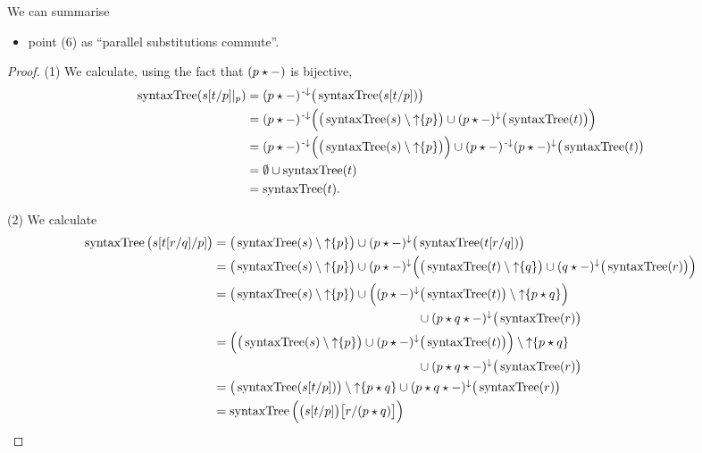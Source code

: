 We can summarise
\begin{itemize}
\item point (6) as ``parallel substitutions commute''.
\end{itemize}
\begin{proof}
(1) We calculate, using the fact that $(p\star -)$ is bijective,
\begin{align*}
\operatorname{syntaxTree}(s[t/p]|_p) &= (p\star -)^{\text{\hspace{0.15em}-}\downarrow}\big(\operatorname{syntaxTree}(s[t/p])\big) \\
&= (p\star -)^{\text{\hspace{0.15em}-}\downarrow}\Big(\big(\operatorname{syntaxTree}(s) \setminus \operatorname{\uparrow}\{p\}\big) \cup (p\star -)^{\downarrow}\big(\operatorname{syntaxTree}(t)\big)\Big) \\
&= (p\star -)^{\text{\hspace{0.15em}-}\downarrow}\Big(\big(\operatorname{syntaxTree}(s) \setminus \operatorname{\uparrow}\{p\}\big)\Big) \cup (p\star -)^{\text{\hspace{0.15em}-}\downarrow}(p\star -)^{\downarrow}\big(\operatorname{syntaxTree}(t)\big) \\
&= \emptyset \cup \operatorname{syntaxTree}(t) \\
&= \operatorname{syntaxTree}(t).
\end{align*}

(2) We calculate
\begin{align*}
\syntaxTree\big(s[t[r/q]/p]\big) &= \big(\syntaxTree(s) \setminus \upset\{p\}\big) \cup (p\concat -)^{\imf}\big(\syntaxTree(t[r/q])\big) \\
&= \big(\syntaxTree(s) \setminus \upset\{p\}\big) \cup (p\concat -)^{\imf}\Big(\big(\syntaxTree(t) \setminus \upset\{q\}\big) \cup (q\concat -)^{\imf}\big(\syntaxTree(r)\big)\Big) \\
&= \begin{multlined}[t] \big(\syntaxTree(s) \setminus \upset\{p\}\big) \cup \Big((p\concat -)^{\imf}\big(\syntaxTree(t)\big) \setminus \upset\{p\concat q\}\Big) \\ \cup (p \concat q\concat -)^{\imf}\big(\syntaxTree(r)\big) \end{multlined} \\
&= \begin{multlined}[t]\Big(\big(\syntaxTree(s) \setminus \upset\{p\}\big) \cup (p\concat -)^{\imf}\big(\syntaxTree(t)\big) \Big)\setminus \upset\{p\concat q\} \\ \cup (p \concat q\concat -)^{\imf}\big(\syntaxTree(r)\big) \end{multlined} \\
&= \big(\syntaxTree(s[t/p])\big)\setminus \upset\{p\concat q\} \cup (p \concat q\concat -)^{\imf}\big(\syntaxTree(r)\big) \\
&= \syntaxTree\Big(\big(s[t/p]\big)\big[r/(p\concat q)\big]\Big)
\end{align*}


\end{proof}
